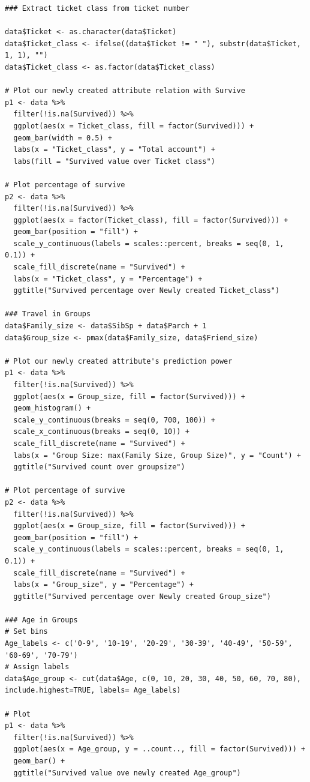 \documentclass[
]{book}
\begin{document}
\begin{verbatim}
### Extract ticket class from ticket number

data$Ticket <- as.character(data$Ticket)
data$Ticket_class <- ifelse((data$Ticket != " "), substr(data$Ticket, 1, 1), "")
data$Ticket_class <- as.factor(data$Ticket_class)

# Plot our newly created attribute relation with Survive
p1 <- data %>%
  filter(!is.na(Survived)) %>%
  ggplot(aes(x = Ticket_class, fill = factor(Survived))) +
  geom_bar(width = 0.5) +
  labs(x = "Ticket_class", y = "Total account") +
  labs(fill = "Survived value over Ticket class")

# Plot percentage of survive
p2 <- data %>%
  filter(!is.na(Survived)) %>%
  ggplot(aes(x = factor(Ticket_class), fill = factor(Survived))) +
  geom_bar(position = "fill") +
  scale_y_continuous(labels = scales::percent, breaks = seq(0, 1, 0.1)) +
  scale_fill_discrete(name = "Survived") +
  labs(x = "Ticket_class", y = "Percentage") +
  ggtitle("Survived percentage over Newly created Ticket_class")

### Travel in Groups
data$Family_size <- data$SibSp + data$Parch + 1
data$Group_size <- pmax(data$Family_size, data$Friend_size)

# Plot our newly created attribute's prediction power
p1 <- data %>%
  filter(!is.na(Survived)) %>%
  ggplot(aes(x = Group_size, fill = factor(Survived))) +
  geom_histogram() +
  scale_y_continuous(breaks = seq(0, 700, 100)) +
  scale_x_continuous(breaks = seq(0, 10)) +
  scale_fill_discrete(name = "Survived") +
  labs(x = "Group Size: max(Family Size, Group Size)", y = "Count") +
  ggtitle("Survived count over groupsize")

# Plot percentage of survive
p2 <- data %>%
  filter(!is.na(Survived)) %>%
  ggplot(aes(x = Group_size, fill = factor(Survived))) +
  geom_bar(position = "fill") +
  scale_y_continuous(labels = scales::percent, breaks = seq(0, 1, 0.1)) +
  scale_fill_discrete(name = "Survived") +
  labs(x = "Group_size", y = "Percentage") +
  ggtitle("Survived percentage over Newly created Group_size")

### Age in Groups
# Set bins
Age_labels <- c('0-9', '10-19', '20-29', '30-39', '40-49', '50-59', '60-69', '70-79')
# Assign labels
data$Age_group <- cut(data$Age, c(0, 10, 20, 30, 40, 50, 60, 70, 80), include.highest=TRUE, labels= Age_labels)

# Plot
p1 <- data %>%
  filter(!is.na(Survived)) %>%
  ggplot(aes(x = Age_group, y = ..count.., fill = factor(Survived))) +
  geom_bar() +
  ggtitle("Survived value ove newly created Age_group")


\end{verbatim}
\end{document}
